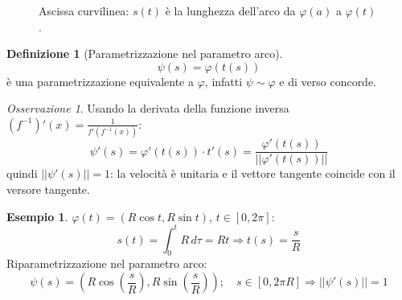 \documentclass[11pt, a4paper, openright]{book}
\theoremstyle{plain}
\theoremstyle{definition}
\newtheorem{definizione}[teorema]{Definizione}
\newtheorem{esempio}[teorema]{Esempio}
\theoremstyle{remark}
\newtheorem{osservazione}[teorema]{Osservazione}
\begin{document}
\begin{figure}[H]
    \centering
    \caption{Ascissa curvilinea: $s(t)$ è la lunghezza dell'arco da $\varphi(a)$ a $\varphi(t)$.}
\end{figure}

\begin{definizione}[Parametrizzazione nel parametro arco]
    \begin{equation}
        \psi(s) = \varphi(t(s))
    \end{equation}
    è una parametrizzazione equivalente a $\varphi$, infatti $\psi \sim \varphi$ e di verso concorde.
\end{definizione}

\begin{osservazione}
    Usando la derivata della funzione inversa $(f^{-1})'(x) = \frac{1}{f'(f^{-1}(x))}$:
    \begin{equation}
        \psi'(s) = \varphi'(t(s)) \cdot t'(s) = \frac{\varphi'(t(s))}{||\varphi'(t(s))||}
    \end{equation}
    quindi $||\psi'(s)|| = 1$: la velocità è unitaria e il vettore tangente coincide con il versore tangente.
\end{osservazione}

\begin{esempio}
    $\varphi(t) = (R\cos t, R\sin t)$, $t \in [0, 2\pi]$:
    \begin{equation}
        s(t) = \int_{0}^{t} R \, d\tau = Rt \Longrightarrow t(s) = \frac{s}{R}
    \end{equation}
    Riparametrizzazione nel parametro arco:
    \begin{equation}
        \psi(s) = \left(R\cos\left(\frac{s}{R}\right), R\sin\left(\frac{s}{R}\right)\right); \quad s \in [0, 2\pi R] \Longrightarrow ||\psi'(s)|| = 1
    \end{equation}
\end{esempio}
\end{document}
